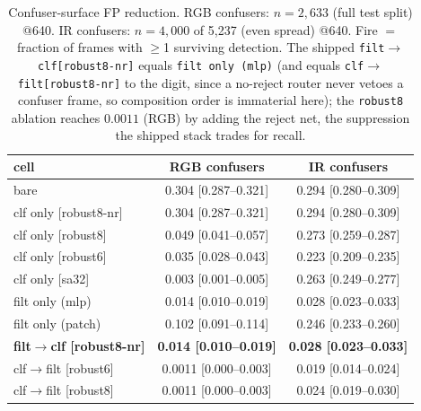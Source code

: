 \begin{table}[htbp]
    \centering
    \caption{Confuser-surface FP reduction. RGB confusers: $n=2{,}633$ (full test split) @640. IR confusers: $n=4{,}000$ of 5{,}237 (even spread) @640. Fire $=$ fraction of frames with $\geq$1 surviving detection. The shipped \texttt{filt$\to$clf[robust8-nr]} equals \texttt{filt only (mlp)} (and equals \texttt{clf$\to$filt[robust8-nr]} to the digit, since a no-reject router never vetoes a confuser frame, so composition order is immaterial here); the \texttt{robust8} ablation reaches $0.0011$ (RGB) by adding the reject net, the suppression the shipped stack trades for recall.}
    \label{tab:ablation_confusers}
    \begin{tabular}{lcc}
        \toprule
        cell & RGB confusers & IR confusers \\
        \midrule
        bare                      & 0.304 [0.287--0.321] & 0.294 [0.280--0.309] \\
        clf only [robust8-nr]     & 0.304 [0.287--0.321] & 0.294 [0.280--0.309] \\
        clf only [robust8]        & 0.049 [0.041--0.057] & 0.273 [0.259--0.287] \\
        clf only [robust6]        & 0.035 [0.028--0.043] & 0.223 [0.209--0.235] \\
        clf only [sa32]           & 0.003 [0.001--0.005] & 0.263 [0.249--0.277] \\
        filt only (mlp)           & 0.014 [0.010--0.019] & 0.028 [0.023--0.033] \\
        filt only (patch)         & 0.102 [0.091--0.114] & 0.246 [0.233--0.260] \\
        \textbf{filt$\to$clf [robust8-nr]} & \textbf{0.014 [0.010--0.019]} & \textbf{0.028 [0.023--0.033]} \\
        clf$\to$filt [robust6]    & 0.0011 [0.000--0.003] & 0.019 [0.014--0.024] \\
        clf$\to$filt [robust8]    & 0.0011 [0.000--0.003] & 0.024 [0.019--0.030] \\
        \bottomrule
    \end{tabular}
\end{table}


